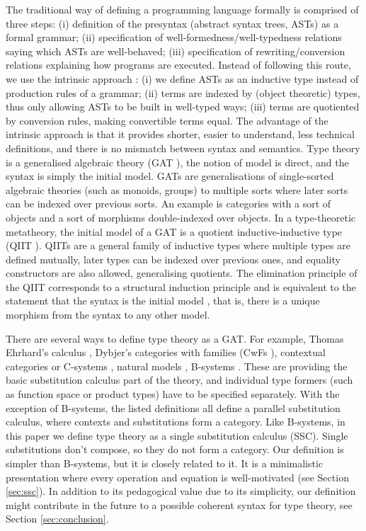 \documentclass[sigplan,10pt,anonymous,review]{acmart}\settopmatter{printfolios=true,printccs=false,printacmref=false}
\begin{document}
The traditional way of defining a programming language formally
\cite{DBLP:books/cu/Ha2016,Pierce:SF2,plfa22.08} is comprised of three
steps: (i) definition of the presyntax (abstract syntax trees, ASTs)
as a formal grammar; (ii) specification of
well-formedness/well-typedness relations saying which ASTs are
well-behaved; (iii) specification of rewriting/conversion relations
explaining how programs are executed. Instead of following this route,
we use the intrinsic approach
\cite{DBLP:conf/csl/AltenkirchR99,DBLP:conf/popl/AltenkirchK16}: (i)
we define ASTs as an inductive type instead of production rules of a
grammar; (ii) terms are indexed by (object theoretic) types, thus only
allowing ASTs to be built in well-typed ways; (iii) terms are
quotiented by conversion rules, making convertible terms equal. The
advantage of the intrinsic approach is that it provides shorter,
easier to understand, less technical definitions, and there is no
mismatch between syntax and semantics. Type theory is a generalised
algebraic theory (GAT \cite{DBLP:journals/apal/Cartmell86}), the
notion of model is direct, and the syntax is simply the initial
model. GATs are generalisations of single-sorted algebraic theories
(such as monoids, groups) to multiple sorts where later sorts can be
indexed over previous sorts. An example is categories with a sort of
objects and a sort of morphisms double-indexed over objects. In a
type-theoretic metatheory, the initial model of a GAT is a quotient
inductive-inductive type (QIIT
\cite{DBLP:journals/pacmpl/KaposiKA19}). QIITs are a general family of
inductive types where multiple types are defined mutually, later types
can be indexed over previous ones, and equality constructors are also
allowed, generalising quotients. The elimination principle of the QIIT
corresponds to a structural induction principle and is
equivalent to the statement that the syntax is the initial model
\cite{DBLP:journals/pacmpl/KaposiKA19}, that is, there is a unique
morphism from the syntax to any other model.

There are several ways to define type theory as a GAT. For example,
Thomas Ehrhard's calculus \cite{ehrhard,coquandEhrhard}, Dybjer's
categories with families (CwFs
\cite{DBLP:conf/types/Dybjer95,Castellan2021}), contextual categories
or C-systems
\cite{DBLP:journals/apal/Cartmell86,DBLP:journals/lmcs/AhrensLV18},
natural models \cite{DBLP:journals/mscs/Awodey18}, B-systems
\cite{AHRENS_EMMENEGGER_NORTH_RIJKE_2023}. These are providing the
basic substitution calculus part of the theory, and individual type
formers (such as function space or product types) have to be specified
separately. With the exception of B-systems, the listed definitions
all define a parallel substitution calculus, where contexts and
substitutions form a category. Like B-systems, in this paper we define
type theory as a single substitution calculus (SSC). Single
substitutions don't compose, so they do not form a category. Our
definition is simpler than B-systems, but it is closely related to
it. It is a minimalistic presentation where every operation and
equation is well-motivated (see Section \ref{sec:ssc}). In addition to
its pedagogical value due to its simplicity, our definition might
contribute in the future to a possible coherent syntax for type
theory, see Section \ref{sec:conclusion}.
\end{document}
